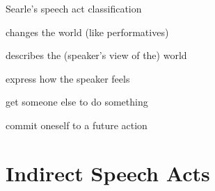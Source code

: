 \documentclass{beamer}
\begin{document}
\begin{frame}{Searle's speech act classification}
  \begin{description}
  \item {} changes the world (like performatives)
  \item {} describes the (speaker's view of the) world 
  \item {}  express how the speaker feels
  \item {} get someone else to do something
  \item {} commit oneself to a future action
  \end{description}

\end{frame}


 

\section{Indirect Speech Acts}
\end{document}
